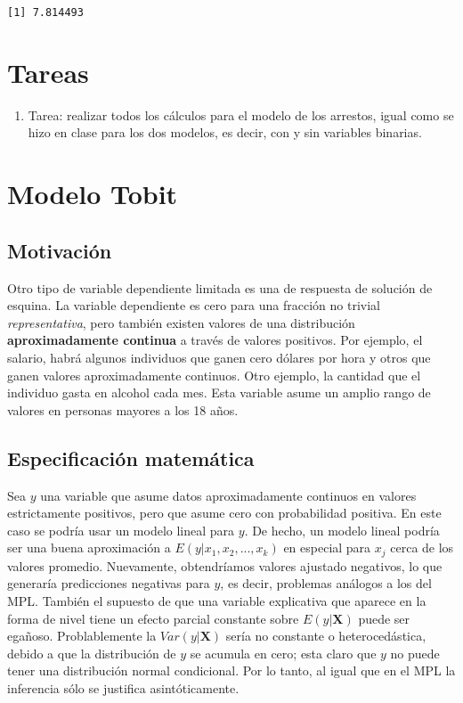 \documentclass[
  letterpaper,
  DIV=11,
  numbers=noendperiod]{scrreprt}
\providecommand{\tightlist}{%
  \setlength{\itemsep}{0pt}\setlength{\parskip}{0pt}}\usepackage{longtable,booktabs,array}
\begin{document}
\begin{verbatim}
[1] 7.814493
\end{verbatim}


\chapter{Tareas}\label{tareas}

\begin{enumerate}
\def\labelenumi{\arabic{enumi}.}
\tightlist
\item
  Tarea: realizar todos los cálculos para el modelo de los arrestos,
  igual como se hizo en clase para los dos modelos, es decir, con y sin
  variables binarias.
\end{enumerate}


\chapter{Modelo Tobit}\label{modelo-tobit}

\section{Motivación}\label{motivaciuxf3n}

Otro tipo de variable dependiente limitada es una de respuesta de
solución de esquina. La variable dependiente es cero para una fracción
no trivial \emph{representativa}, pero también existen valores de una
distribución \textbf{aproximadamente continua} a través de valores
positivos. Por ejemplo, el salario, habrá algunos individuos que ganen
cero dólares por hora y otros que ganen valores aproximadamente
continuos. Otro ejemplo, la cantidad que el individuo gasta en alcohol
cada mes. Esta variable asume un amplio rango de valores en personas
mayores a los 18 años.

\section{Especificación
matemática}\label{especificaciuxf3n-matemuxe1tica}

Sea \(y\) una variable que asume datos aproximadamente continuos en
valores estrictamente positivos, pero que asume cero con probabilidad
positiva. En este caso se podría usar un modelo lineal para \(y\). De
hecho, un modelo lineal podría ser una buena aproximación a
\(E(y|x_1,x_2,...,x_k)\) en especial para \(x_j\) cerca de los valores
promedio. Nuevamente, obtendríamos valores ajustado negativos, lo que
generaría predicciones negativas para \(y\), es decir, problemas
análogos a los del MPL. También el supuesto de que una variable
explicativa que aparece en la forma de nivel tiene un efecto parcial
constante sobre \(E(y|\mathbf{X})\) puede ser egañoso. Problablemente la
\(Var(y|\mathbf{X})\) sería no constante o heterocedástica, debido a que
la distribución de \(y\) se acumula en cero; esta claro que \(y\) no
puede tener una distribución normal condicional. Por lo tanto, al igual
que en el MPL la inferencia sólo se justifica asintóticamente.
\end{document}
